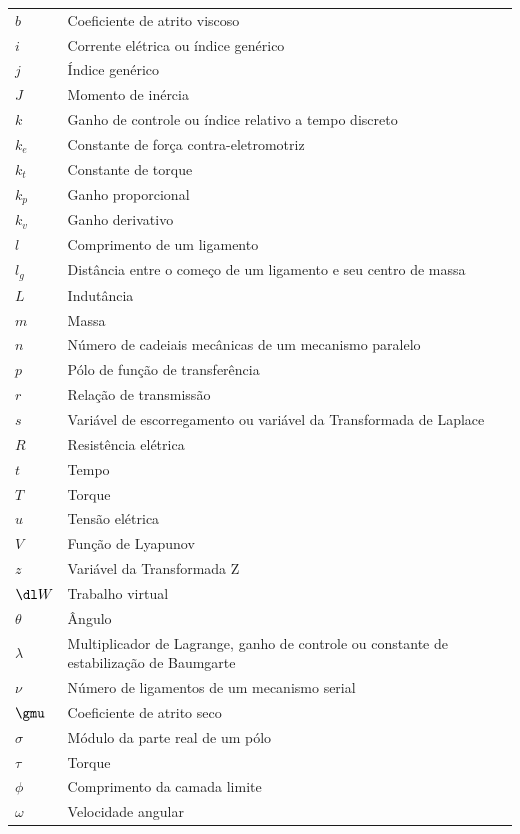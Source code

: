 \documentclass[]{politex}
\begin{document}
\begin{longtable}{lp{}}
  $b$ & Coeficiente de atrito viscoso \\
  $i$ & Corrente elétrica ou índice genérico \\
  $j$ & Índice genérico \\
  $J$ & Momento de inércia \\
  $k$ & Ganho de controle ou índice relativo a tempo discreto \\
  $k_e$ & Constante de força contra-eletromotriz \\
  $k_t$ & Constante de torque \\
  $k_p$ & Ganho proporcional \\
  $k_v$ & Ganho derivativo \\
  $l$ & Comprimento de um ligamento \\
  $l_g$ & Distância entre o começo de um ligamento e seu centro de massa \\
  $L$ & Indutância \\
  $m$ & Massa \\
  $n$ & Número de cadeiais mecânicas de um mecanismo paralelo \\
  $p$ & Pólo de função de transferência \\
  $r$ & Relação de transmissão \\
  $s$ & Variável de escorregamento ou variável da Transformada de Laplace \\
  $R$ & Resistência elétrica \\
  $t$ & Tempo \\
  $T$ & Torque \\
  $u$ & Tensão elétrica \\
  $V$ & Função de Lyapunov \\
  $z$ & Variável da Transformada Z \\
  $\dl W$ & Trabalho virtual \\
  $\theta$ & Ângulo \\
  $\lambda$ & Multiplicador de Lagrange, ganho de controle ou constante de estabilização de Baumgarte \\
  $\nu$ & Número de ligamentos de um mecanismo serial \\
  $\gmu$ & Coeficiente de atrito seco \\
  $\sigma$ & Módulo da parte real de um pólo \\
  $\tau$ & Torque \\
  $\phi$ & Comprimento da camada limite \\
  $\omega$ & Velocidade angular \\
\end{longtable}
\end{document}
